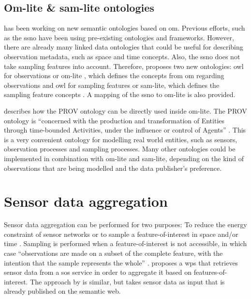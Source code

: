 \subsection{Om-lite \& sam-lite ontologies}
\cite{SSW:Cox4} has been working on new semantic ontologies based on \ac{om}. Previous efforts, such as the \ac{ssno} have been using pre-existing ontologies and frameworks. However, there are already many linked data ontologies that could be useful for describing observation metadata, such as space and time concepts. Also, the \ac{ssno} does not take sampling features into account. Therefore, \cite{SSW:Cox4} proposes two new ontologies: \ac{owl} for observations or om-lite \citep{SSW:Cox3}, which defines the concepts from \ac{om} regarding observations and \ac{owl} for sampling features or sam-lite, which defines the sampling feature concepts \citep{SSW:Cox2}. A mapping of the \ac{ssno} to om-lite is also provided.

\cite{SSW:Cox4} describes how the PROV ontology \citep{LD:PROV} can be directly used inside om-lite. The PROV ontology is \enquote{concerned with the production and transformation of Entities through time-bounded Activities, under the influence or control of Agents} \cite[p. 12]{SSW:Cox4}. This is a very convenient ontology for modelling real world entities, such as sensors, observation processes and sampling processes. Many other ontologies could be implemented in combination with om-lite and sam-lite, depending on the kind of observations that are being modelled and the data publisher's preference. 

\section{Sensor data aggregation}
Sensor data aggregation can be performed for two purposes: To reduce the energy constraint of sensor networks \citep{SW:Korteweg} or to sample a feature-of-interest in space and/or time \citep{SDI:INSPIRE2}. Sampling is performed when a feature-of-interest is not accessible, in which case \enquote{observations are made on a subset of the complete feature, with the intention that the sample represents the whole} \citep{SSW:Cox3}. \cite{SSW:Stasch3} proposes a \ac{wps} that retrieves sensor data from a \ac{sos} service in order to aggregate it based on features-of-interest. The approach by \cite{SSW:Stasch} is similar, but takes sensor data as input that is already published on the semantic web.


